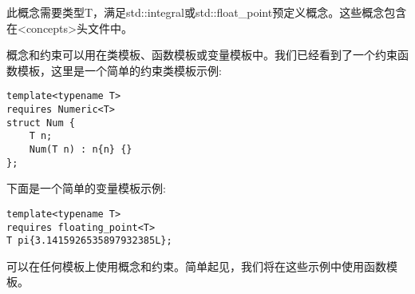 此概念需要类型T，满足std::integral或std::float\_point预定义概念。这些概念包含在<concepts>头文件中。

概念和约束可以用在类模板、函数模板或变量模板中。我们已经看到了一个约束函数模板，这里是一个简单的约束类模板示例:

\begin{lstlisting}[style=styleCXX]
template<typename T>
requires Numeric<T>
struct Num {
	T n;
	Num(T n) : n{n} {}
};
\end{lstlisting}

下面是一个简单的变量模板示例:

\begin{lstlisting}[style=styleCXX]
template<typename T>
requires floating_point<T>
T pi{3.1415926535897932385L};
\end{lstlisting}

可以在任何模板上使用概念和约束。简单起见，我们将在这些示例中使用函数模板。

